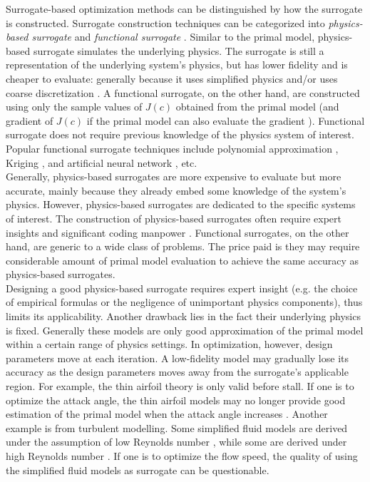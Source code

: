 \documentclass[a4paper,onecolumn]{article}
\theoremstyle{remark}
\begin{document}
\noindent Surrogate-based optimization methods can be distinguished by how the surrogate is 
constructed. Surrogate construction techniques can be categorized into
\emph{physics-based surrogate} and \emph{functional surrogate} \cite{Opt Koziel Book}.
Similar to the primal model, physics-based surrogate simulates the underlying physics.
The surrogate is still a representation of the underlying system's physics, but has 
lower fidelity and is cheaper to evaluate: generally because it
uses simplified physics \cite{simplified physics, Space mapping 1} and/or
uses coarse discretization \cite{coarse discretization}.
A functional surrogate, on the other hand, are constructed using only the sample
values of $J(c)$ obtained from the primal model (and gradient of $J(c)$ if
the primal model can also evaluate the gradient \cite{gradient kriging surrogate}).
Functional surrogate does not require previous knowledge of the physics system of interest. 
Popular functional surrogate techniques include polynomial approximation 
\cite{poly functional surrogate}, Kriging \cite{kriging functional surrogate},
and artificial neural network \cite{ann functional surrogate}, etc.\\

\noindent Generally, physics-based surrogates are more expensive to evaluate but more accurate,
mainly because they already embed some knowledge of the system's physics. 
However, physics-based surrogates are dedicated to the specific systems of interest.
The construction of physics-based surrogates often require expert insights
and significant coding manpower \cite{Opt Koziel Book}. 
Functional surrogates, on the other hand, are generic to a wide class of problems.
The price paid is they may require considerable amount of primal model evaluation 
to achieve the same accuracy as physics-based surrogates. \\

\noindent Designing a good physics-based surrogate requires expert insight
(e.g. the choice of empirical formulas or the negligence of unimportant physics components),
thus limits its applicability. Another drawback lies in the fact their underlying
physics is fixed. Generally these models are only good approximation of the primal model
within a certain range of physics settings. In optimization, however, design parameters 
move at each iteration. A low-fidelity model may gradually lose its accuracy 
as the design parameters moves away from the surrogate's applicable region.
For example, the thin airfoil theory is only valid before stall. 
If one is to optimize the attack angle, the thin airfoil models may no longer 
provide good estimation of the primal model when the attack angle increases \cite{thin airfoil}.
Another example is from turbulent modelling.
Some simplified fluid models are derived under the assumption of low Reynolds number
\cite{turbulent modeling R low}, while some are derived under high Reynolds number 
\cite{turbulent modeling R high}.
If one is to optimize the flow speed, the quality of using the simplified fluid models
as surrogate can be questionable.\\
\end{document}
